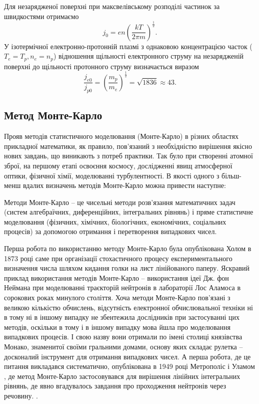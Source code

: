 \documentclass[a4paper,12pt]{article}
\begin{document}
Для незарядженої поверхні при максвелівському розподілі частинок за швидкостями отримаємо
\begin{equation} \label{eq:density}
j_0 = e n \left( \frac{kT}{2 \pi m} \right)^\frac{1}{2}.
\end{equation}
У ізотермічної електронно-протонній плазмі з однаковою концентрацією часток ($T_e = T_p, n_e = n_p$) відношення щільності електронного струму на незарядженій поверхні до щільності протонного струму визначається виразом \cite{novikov}
\[
\frac{j_{e0}}{j_{p0}} = \left( \frac{m_p}{m_e} \right)^\frac{1}{2} = \sqrt{1836} \approx 43.
\]

\subsection{Метод Монте-Карло}
Прояв методів статистичного моделювання (Монте-Карло) в різних областях прикладної математики, як правило, пов'язаний з необхідністю вирішення якісно нових завдань, що виникають з потреб практики. Так було при створенні атомної зброї, на першому етапі освоєння космосу, дослідженні явищ атмосферної оптики, фізичної хімії, моделюванні турбулентності. В якості одного з більш-менш вдалих визначень методів Монте-Карло можна привести наступне:

Методи Монте-Карло -- це чисельні методи розв'язання математичних задач (систем алгебраїчних, диференційних, інтегральних рівнянь) і пряме статистичне моделювання (фізичних, хімічних, біологічних, економічних, соціальних процесів) за допомогою отримання і перетворення випадкових чисел.
 
Перша робота по використанню методу Монте-Карло була опублікована Холом в 1873 році саме при організації стохастичного процесу експериментального визначення числа шляхом кидання голки на лист лінійованого паперу. Яскравий приклад використання методів Монте-Карло -- використання ідеї Дж. фон Неймана при моделюванні траєкторій нейтронів в лабораторії Лос Аламоса в сорокових роках минулого століття. Хоча методи Монте-Карло пов'язані з великою кількістю обчислень, відсутність електронної обчислювальної техніки ні в тому ні в іншому випадку не збентежила дослідників при застосуванні цих методів, оскільки в тому і в іншому випадку мова йшла про моделювання випадкових процесів. І свою назву вони отримали по імені столиці князівства Монако, знаменитої своїми гральними домами, основу яких складає рулетка -- досконалий інструмент для отримання випадкових чисел. А перша робота, де це питання викладався систематично, опублікована в 1949 році Метрополіс і Уламом \cite{Metropolis}, де метод Монте-Карло застосовувався для 
вирішення лінійних інтегральних рівнянь, де явно вгадувалось завдання про проходження нейтронів через речовину. \cite{belocerkovskyi}.
\end{document}
